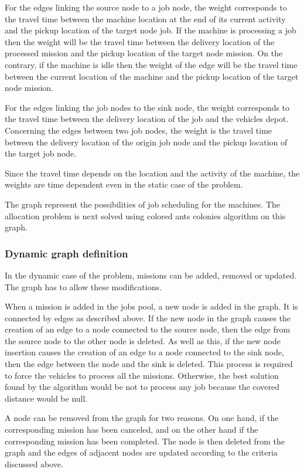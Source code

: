 \documentclass[a4paper,10pt]{article}
\begin{document}
For the edges linking the source node to a job node, the weight corresponds to the travel time between the machine location at the end of its current activity and the pickup location of the target node job. If the machine is processing a job then the weight will be the travel time between the delivery location of the processed mission and the pickup location of the target node mission. On the contrary, if the machine is idle then the weight of the edge will be the travel time between the current location of the machine and the pickup location of the target node mission.

For the edges linking the job nodes to the sink node, the weight corresponds to the travel time between the delivery location of the job and the vehicles depot.
Concerning the edges between two job nodes, the weight is the travel time between the delivery location of the origin job node and the pickup location of the target job node.

Since the travel time depends on the location and the activity of the machine, the weights are time dependent even in the static case of the problem.

The graph represent the possibilities of job scheduling for the machines. The allocation problem is next solved using colored ants colonies algorithm on this graph.

\subsubsection{Dynamic graph definition}
In the dynamic case of the problem, missions can be added, removed or updated. The graph has to allow these modifications.

When a mission is added in the jobs pool, a new node is added in the graph. It is connected by edges as described above. If the new node in the graph causes the creation of an edge to a node connected to the source node, then the edge from the source node to the other node is deleted. As well as this, if the new node insertion causes the creation of an edge to a node connected to the sink node, then the edge between the node and the sink is deleted. This process is required to force the vehicles to process all the missions. Otherwise, the best solution found by the algorithm would be not to process any job because the covered distance would be null.


A node can be removed from the graph for two reasons. On one hand, if the corresponding mission has been canceled, and on the other hand if the corresponding mission has been completed. The node is then deleted from the graph and the edges of adjacent nodes are updated according to the criteria discussed above.
\end{document}
